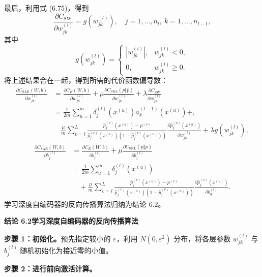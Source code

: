 最后，利用式 (6.75)，得到
\begin{equation}
\frac{\partial C_{\mathrm{SW}}}{\partial w_{jk}^{(l)}}=g(w_{jk}^{(l)}),\quad j=1,\ldots,n_l,\ k=1,\ldots,n_{l-1},
\tag{6.82}
\end{equation}
其中
\[
g(w_{jk}^{(l)})=\begin{cases}|w_{jk}^{(l)}|,&w_{jk}^{(l)}<0,\\0,&w_{jk}^{(l)}\geq0.\end{cases}
\]
将上述结果合在一起，得到所需的代价函数偏导数：
\begin{equation}
\begin{aligned}
\frac{\partial C_{\mathrm{SAE}}(W,b)}{\partial w_{jk}^{(l)}}
&=\frac{\partial C_E(W,b)}{\partial w_{jk}^{(l)}}+\mu\frac{\partial C_{\mathrm{SKL}}(p\Vert\widehat p)}{\partial w_{jk}^{(l)}}+\lambda\frac{\partial C_{\mathrm{SW}}}{\partial w_{jk}^{(l)}}\\
&=\frac1{2m}\sum_{u=1}^m\delta_j^{(l)}(x^{(u)})a_k^{(l-1)}(x^{(u)})+,\\
&\quad\frac\mu m\sum_{v=l}^L\frac{\widehat p_j^{(v)}(x^{(u)})-p^{(v)}}{\widehat p_j^{(v)}(x^{(u)})(1-\widehat p_j^{(v)}(x^{(u)}))}
\frac{\partial\widehat p_j^{(v)}(x^{(u)})}{\partial w_{jk}^{(l)}}+\lambda g(w_{jk}^{(l)}),
\end{aligned}\tag{6.83}
\end{equation}
\begin{equation}
\begin{aligned}
\frac{\partial C_{\mathrm{SAE}}(W,b)}{\partial b_j^{(l)}}&=
\frac{\partial C_E(W,b)}{\partial b_j^{(l)}}+\mu\frac{\partial C_{\mathrm{SKL}}(p\Vert\widehat p)}{\partial b_j^{(l)}}\\
&=\frac1{2m}\sum_{u=1}^m\delta_j^{(l)}(x^{(u)})\\
&\quad+\frac\mu m\sum_{v=l}^L\frac{\widehat p_j^{(v)}(x^{(u)})-p^{(v)}}{\widehat p_j^{(v)}(x^{(u)})(1-\widehat p_j^{(v)}(x^{(u)}))}
\frac{\partial\widehat p_j^{(v)}(x^{(u)})}{\partial b_g^{(l)}}.
\end{aligned}\tag{6.84}
\end{equation}
学习深度自编码器的反向传播算法归纳为结论 6.2。

\noindent\textbf{结论 6.2\quad 学习深度自编码器的反向传播算法}

\noindent\textbf{步骤 1：初始化。}预先指定较小的 $\varepsilon$，利用 $N(0,\varepsilon^2)$ 分布，将各层参数 $w_{jk}^{(l)}$ 与 $b_j^{(l)}$ 随机初始化为接近零的小值。

\noindent\textbf{步骤 2：进行前向激活计算。}

